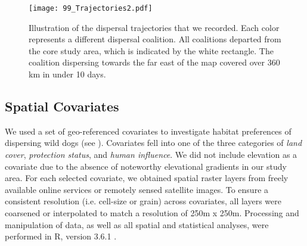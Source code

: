 \documentclass[abstract=on,10pt,a4paper,bibliography=totocnumbered]{scrartcl}
\begin{document}
\begin{figure}[h]
  \begin{center}
    \texttt{[image: 99\_Trajectories2.pdf]}
    \caption{Illustration of the dispersal trajectories that we recorded. Each
    color represents a different dispersal coalition. All coalitions departed
    from the core study area, which is indicated by the white rectangle. The
    coalition dispersing towards the far east of the map covered over 360 km in
    under 10 days.}
    \label{Trajectories}
  \end{center}
\end{figure}

\subsection{Spatial Covariates}
We used a set of geo-referenced covariates to investigate habitat preferences of
dispersing wild dogs (see ). Covariates fell into one of the
three categories of \textit{land cover}, \textit{protection status}, and
\textit{human influence}. We did not include elevation as a covariate due to the
absence of noteworthy elevational gradients in our study area. For each selected
covariate, we obtained spatial raster layers from freely available online
services or remotely sensed satellite images. To ensure a consistent resolution
(i.e. cell-size or grain) across covariates, all layers were coarsened or
interpolated to match a resolution of 250m x 250m. Processing and manipulation
of data, as well as all spatial and statistical analyses, were performed in R,
version 3.6.1 \citep{R.2019}.
\end{document}
